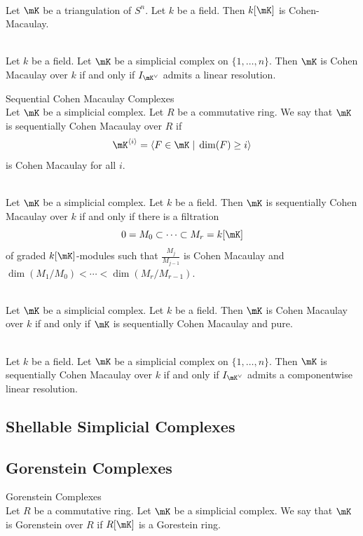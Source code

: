\documentclass[a4paper]{article}
\begin{document}
\begin{crl}{}{}\\
Let $\mK$ be a triangulation of $S^n$. Let $k$ be a field. Then $k[\mK]$ is Cohen-Macaulay. 
\end{crl}

\begin{prp}{}{}\\
Let $k$ be a field. Let $\mK$ be a simplicial complex on $\{1,\dots,n\}$. Then $\mK$ is Cohen Macaulay over $k$ if and only if $I_{\mK^\vee}$ admits a linear resolution. 
\end{prp}

\begin{defn}{Sequential Cohen Macaulay Complexes}{}\\
Let $\mK$ be a simplicial complex. Let $R$ be a commutative ring. We say that $\mK$ is sequentially Cohen Macaulay over $R$ if $$\mK^{\langle i\rangle}=\langle F\in\mK\;|\;\dim(F)\geq i\rangle$$ is Cohen Macaulay for all $i$. 
\end{defn}

\begin{prp}{}{}\\
Let $\mK$ be a simplicial complex. Let $k$ be a field. Then $\mK$ is sequentially Cohen Macaulay over $k$ if and only if there is a filtration $$0=M_0\subset\cdots\subset M_r=k[\mK]$$ of graded $k[\mK]$-modules such that $\frac{M_j}{M_{j-1}}$ is Cohen Macaulay and $\dim(M_1/M_0)<\cdots<\dim(M_r/M_{r-1})$. 
\end{prp}

\begin{prp}{}{}\\
Let $\mK$ be a simplicial complex. Let $k$ be a field. Then $\mK$ is Cohen Macaulay over $k$ if and only if $\mK$ is sequentially Cohen Macaulay and pure. 
\end{prp}

\begin{prp}{}{}\\
Let $k$ be a field. Let $\mK$ be a simplicial complex on $\{1,\dots,n\}$. Then $\mK$ is sequentially Cohen Macaulay over $k$ if and only if $I_{\mK^\vee}$ admits a componentwise linear resolution. 
\end{prp}

\subsection{Shellable Simplicial Complexes}

\subsection{Gorenstein Complexes}
\begin{defn}{Gorenstein Complexes}{}\\
Let $R$ be a commutative ring. Let $\mK$ be a simplicial complex. We say that $\mK$ is Gorenstein over $R$ if $R[\mK]$ is a Gorestein ring. 
\end{defn}
\end{document}
